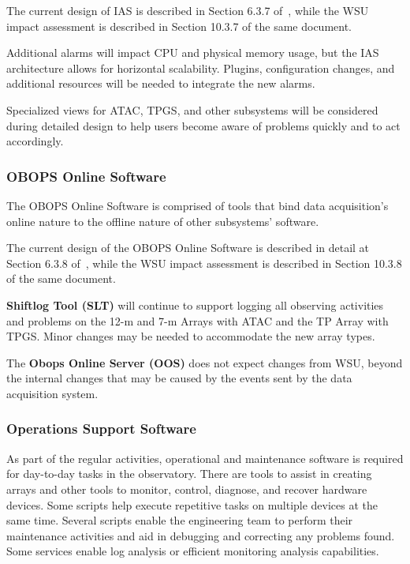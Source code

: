 The current design of IAS is described in Section 6.3.7 of~\cite{CSA-IA}, while the WSU impact assessment is described in Section 10.3.7 of the same document.

Additional alarms will impact CPU and physical memory usage, but the IAS architecture allows for horizontal scalability. Plugins, configuration changes, and additional resources will be needed to integrate the new alarms.

Specialized views for ATAC, TPGS, and other subsystems will be considered during detailed design to help users become aware of problems quickly and to act accordingly.

\subsubsection{OBOPS Online Software}
The OBOPS Online Software is comprised of tools that bind data acquisition's online nature to the offline nature of other subsystems' software.

The current design of the OBOPS Online Software is described in detail at Section 6.3.8 of~\cite{CSA-IA}, while the WSU impact assessment is described in Section 10.3.8 of the same document.

\textbf{Shiftlog Tool (SLT)} will continue to support logging all observing activities and problems on the 12-m and 7-m Arrays with ATAC and the TP Array with TPGS. Minor changes may be needed to accommodate the new array types.

The \textbf{Obops Online Server (OOS)} does not expect changes from WSU, beyond the internal changes that may be caused by the events sent by the data acquisition system.

\subsubsection{Operations Support Software}
As part of the regular activities, operational and maintenance software is required for day-to-day tasks in the observatory. There are tools to assist in creating arrays and other tools to monitor, control, diagnose, and recover hardware devices. Some scripts help execute repetitive tasks on multiple devices at the same time. Several scripts enable the engineering team to perform their maintenance activities and aid in debugging and correcting any problems found. Some services enable log analysis or efficient monitoring analysis capabilities.

